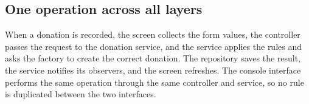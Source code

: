 \subsection{One operation across all layers}

When a donation is recorded, the screen collects the form values, the controller passes the request to the donation service, and the service applies the rules and asks the factory to create the correct donation. The repository saves the result, the service notifies its observers, and the screen refreshes. The console interface performs the same operation through the same controller and service, so no rule is duplicated between the two interfaces.
